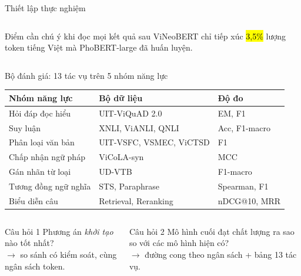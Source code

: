 \begin{frame}{Thiết lập thực nghiệm}
\begin{columns}[T]
\begin{column}{0.58\textwidth}
  \vspace{0.5em}
  \begin{block}{Điểm cần chú ý khi đọc mọi kết quả sau}
    \small ViNeoBERT chỉ tiếp xúc \hl{3,5\%} lượng token tiếng Việt mà
    PhoBERT-large đã huấn luyện.
  \end{block}
\end{column}
\end{columns}
\end{frame}

\begin{frame}{Bộ đánh giá: 13 tác vụ trên 5 nhóm năng lực}
\vspace{0.4em}
\centering
\small
\begin{tabular}{@{} L{3.4cm} L{6.0cm} L{3.6cm}@{}}
  \toprule
  \color{vnNavy}\bfseries Nhóm năng lực &
  \color{vnNavy}\bfseries Bộ dữ liệu &
  \color{vnNavy}\bfseries Độ đo\\
  \midrule
  Hỏi đáp đọc hiểu     & UIT-ViQuAD 2.0            & EM, F1\\
  Suy luận             & XNLI, ViANLI, QNLI        & Acc, F1-macro\\
  Phân loại văn bản    & UIT-VSFC, VSMEC, ViCTSD   & F1\\
  Chấp nhận ngữ pháp   & ViCoLA-syn                & MCC\\
  Gán nhãn từ loại     & UD-VTB                    & F1-macro\\
  Tương đồng ngữ nghĩa & STS, Paraphrase           & Spearman, F1\\
  Biểu diễn câu        & Retrieval, Reranking      & nDCG@10, MRR\\
  \bottomrule
\end{tabular}

\vspace{0.9em}
\begin{columns}[T]
\begin{column}{0.47\textwidth}
  \begin{block}{Câu hỏi 1}
    \small Phương án \emph{khởi tạo} nào tốt nhất?\\
    $\rightarrow$ so sánh có kiểm soát, cùng ngân sách token.
  \end{block}
\end{column}

\begin{column}{0.47\textwidth}
  \begin{block}{Câu hỏi 2}
    \small Mô hình cuối đạt chất lượng ra sao so với các mô hình hiện có?\\
    $\rightarrow$ đường cong theo ngân sách + bảng 13 tác vụ.
  \end{block}
\end{column}
\end{columns}
\end{frame}

